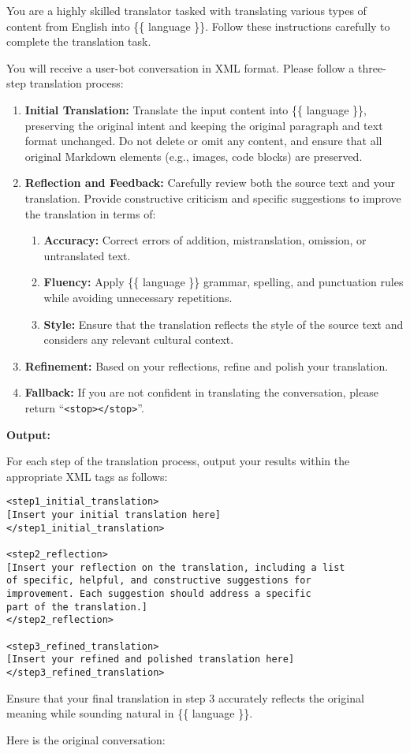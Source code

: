 \begin{tcolorbox}[title={The Prompt used for Translation}]
You are a highly skilled translator tasked with translating various types of content from English into \{\{ language \}\}. Follow these instructions carefully to complete the translation task.

You will receive a user-bot conversation in XML format. Please follow a three-step translation process:

\begin{enumerate}
  \item \textbf{Initial Translation:} Translate the input content into \{\{ language \}\}, preserving the original intent and keeping the original paragraph and text format unchanged. Do not delete or omit any content, and ensure that all original Markdown elements (e.g., images, code blocks) are preserved.
  \item \textbf{Reflection and Feedback:} Carefully review both the source text and your translation. Provide constructive criticism and specific suggestions to improve the translation in terms of:
    \begin{enumerate}[label=(\roman*)]
      \item \textbf{Accuracy:} Correct errors of addition, mistranslation, omission, or untranslated text.
      \item \textbf{Fluency:} Apply \{\{ language \}\} grammar, spelling, and punctuation rules while avoiding unnecessary repetitions.
      \item \textbf{Style:} Ensure that the translation reflects the style of the source text and considers any relevant cultural context.
    \end{enumerate}
  \item \textbf{Refinement:} Based on your reflections, refine and polish your translation.
  \item \textbf{Fallback:} If you are not confident in translating the conversation, please return ``\texttt{<stop></stop>}''.
\end{enumerate}

\bigskip
\textbf{Output:}

For each step of the translation process, output your results within the appropriate XML tags as follows:
\begin{verbatim}
<step1_initial_translation>
[Insert your initial translation here]
</step1_initial_translation>

<step2_reflection>
[Insert your reflection on the translation, including a list 
of specific, helpful, and constructive suggestions for 
improvement. Each suggestion should address a specific 
part of the translation.]
</step2_reflection>

<step3_refined_translation>
[Insert your refined and polished translation here]
</step3_refined_translation>
\end{verbatim}

Ensure that your final translation in step 3 accurately reflects the original meaning while sounding natural in \{\{ language \}\}.

Here is the original conversation:
\label{box:trans_prompt}
\end{tcolorbox}
